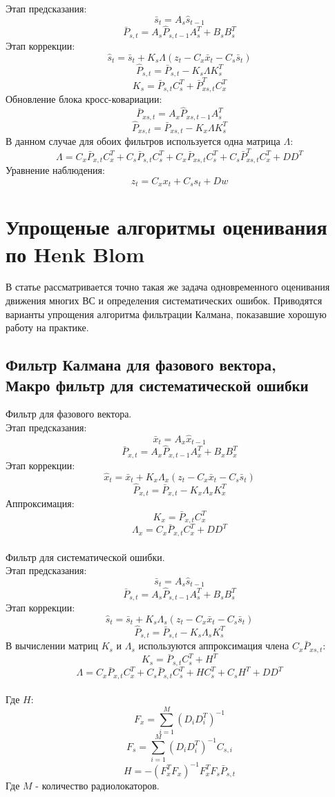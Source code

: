 \noindent Этап предсказания:
\[\bar{s}_{t} = A_{s}\hat{s}_{t-1} \]
\[\bar{P}_{s,t} = A_{s}\hat{P}_{s,t-1}A_{s}^T + B_{s}B_{s}^T\]
Этап коррекции:
\[\hat{s}_{t} = \bar{s}_{t} + K_{s}\Lambda(z_{t} - C_{x}\bar{x}_{t} - C_{s}\bar{s}_{t})\]
\[\hat{P}_{s,t} = \bar{P}_{s,t} - K_{s}\Lambda K_{s}^T\]
\[K_{s} = \bar{P}_{s,t}C_{s}^T + \bar{P}_{xs,t}^TC_{x}^T \] 
Обновление блока кросс-ковариации:
\[\bar{P}_{xs,t} = A_{x}\hat{P}_{xs,t-1}A_{s}^T\]
\[\hat{P}_{xs,t} = \bar{P}_{xs,t} - K_{x}\Lambda K_{s}^T\] 
В данном случае для обоих фильтров используется одна матрица $\Lambda$:
\[\Lambda = C_{x}\bar{P}_{x,t}C_{x}^T + C_{s}\bar{P}_{s,t}C_{s}^T + C_{x}\bar{P}_{xs,t}C_{s}^T + 
C_{s}\bar{P}_{xs,t}^TC_{x}^T + DD^T\] 
Уравнение наблюдения:
\[z_{t} = C_{x}x_{t} + C_{s}s_{t} + Dw\]


\section{Упрощеные алгоритмы оценивания по Henk Blom}

В статье \cite{Blom1993} рассматривается точно такая же задача одновременного 
оценивания движения многих ВС и определения систематических ошибок. 
Приводятся варианты упрощения алгоритма фильтрации Калмана, 
показавшие хорошую работу на практике.  

\subsection{Фильтр Калмана для фазового вектора, \\Макро фильтр для систематической ошибки}
\noindent Фильтр для фазового вектора. \\


\noindent Этап предсказания:
\[\bar{x}_{t} = A_{x}\hat{x}_{t-1} \]
\[\bar{P}_{x,t} = A_{x}\hat{P}_{x,t-1}A_{x}^T + B_{x}B_{x}^T\]
Этап коррекции:
\[\hat{x}_{t} = \bar{x}_{t} + K_{x}\Lambda_{x}(z_{t} - C_{x}\bar{x}_{t} - C_{s}\bar{s}_{t})\]
\[\hat{P}_{x,t} = \bar{P}_{x,t} - K_{x}\Lambda_{x} K_{x}^T\] 
Аппроксимация:
\[K_{x} = \bar{P}_{x,t}C_{x}^T \]
\[\Lambda_{x} = C_{x}\bar{P}_{x,t}C_{x}^T + DD^T\] \\
Фильтр для систематической ошибки. \\


\noindent Этап предсказания:
\[\bar{s}_{t} = A_{s}\hat{s}_{t-1} \]
\[\bar{P}_{s,t} = A_{s}\hat{P}_{s,t-1}A_{s}^T + B_{s}B_{s}^T\]
Этап коррекции:
\[\hat{s}_{t} = \bar{s}_{t} + K_{s}\Lambda_{s}(z_{t} - C_{x}\bar{x}_{t} - C_{s}\bar{s}_{t})\]
\[\hat{P}_{s,t} = \bar{P}_{s,t} - K_{s}\Lambda_{s} K_{s}^T\] 
В вычислении матриц $K_{s}$ и $\Lambda_{s}$ используются аппроксимация члена $C_{x}\bar{P}_{xs,t}$:
\[K_{s} = \bar{P}_{s,t}C_{s}^T + H^T \]
\[\Lambda = C_{x}\bar{P}_{x,t}C_{x}^T + C_{s}\bar{P}_{s,t}C_{s}^T + HC_{s}^T + 
C_{s}H^T + DD^T\] \\
Где $H$:
\[F_{x} = \sum_{i = 1}^{M}(D_{i}D_{i}^T)^{-1}\]
\[F_{s} = \sum_{i = 1}^{M}(D_{i}D_{i}^T)^{-1}C_{s,i}\]
\[H = -(F_{x}^TF_{x})^{-1}F_{x}^TF_{s}\bar{P}_{s,t}\] 
Где $M$ - количество радиолокаторов. \\

